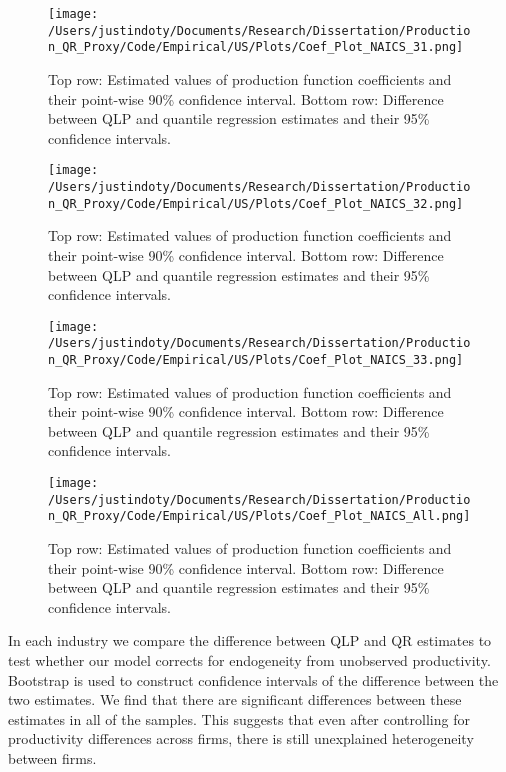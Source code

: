 \documentclass[11pt]{article}
\begin{document}

\label{Tab:USsummary}


\begin{figure}[H]
\centering
\texttt{[image: /Users/justindoty/Documents/Research/Dissertation/Production\_QR\_Proxy/Code/Empirical/US/Plots/Coef\_Plot\_NAICS\_31.png]}
\caption{Top row: Estimated values of production function coefficients and their point-wise 90\% confidence interval. Bottom row: Difference between QLP and quantile regression estimates and their 95\% confidence intervals.}
\label{fig:31coef}
\end{figure}

\begin{figure}[H]
\centering
\texttt{[image: /Users/justindoty/Documents/Research/Dissertation/Production\_QR\_Proxy/Code/Empirical/US/Plots/Coef\_Plot\_NAICS\_32.png]}
\caption{Top row: Estimated values of production function coefficients and their point-wise 90\% confidence interval. Bottom row: Difference between QLP and quantile regression estimates and their 95\% confidence intervals.}
\label{fig:32coef}
\end{figure}

\begin{figure}[H]
\centering
\texttt{[image: /Users/justindoty/Documents/Research/Dissertation/Production\_QR\_Proxy/Code/Empirical/US/Plots/Coef\_Plot\_NAICS\_33.png]}
\caption{Top row: Estimated values of production function coefficients and their point-wise 90\% confidence interval. Bottom row: Difference between QLP and quantile regression estimates and their 95\% confidence intervals.}
\label{fig:33coef}
\end{figure}

\begin{figure}[H]
\centering
\texttt{[image: /Users/justindoty/Documents/Research/Dissertation/Production\_QR\_Proxy/Code/Empirical/US/Plots/Coef\_Plot\_NAICS\_All.png]}
\caption{Top row: Estimated values of production function coefficients and their point-wise 90\% confidence interval. Bottom row: Difference between QLP and quantile regression estimates and their 95\% confidence intervals.}
\label{fig:USallcoef}
\end{figure}

In each industry we compare the difference between QLP and QR estimates to test whether our model corrects for endogeneity from unobserved productivity. Bootstrap is used to construct confidence intervals of the difference between the two estimates. We find that there are significant differences between these estimates in all of the samples. This suggests that even after controlling for productivity differences across firms, there is still unexplained heterogeneity between firms.
\end{document}
